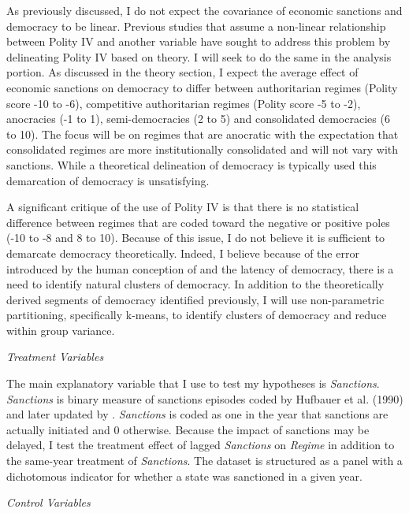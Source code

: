 \documentclass[a4paper]{article}\usepackage[]{graphicx}\usepackage[]{color}
\begin{document}
\par
As previously discussed, I do not expect the covariance of economic sanctions and democracy to be linear. Previous studies that assume a non-linear relationship between Polity IV and another variable have sought to address this problem by delineating Polity IV based on theory. I will seek to do the same in the analysis portion. As discussed in the theory section, I expect the average effect of economic sanctions on democracy to differ between authoritarian regimes (Polity score -10 to -6), competitive authoritarian regimes (Polity score -5 to -2), anocracies (-1 to 1), semi-democracies (2 to 5) and consolidated democracies (6 to 10). The focus will be on regimes that are anocratic \citep{vreeland2008effect, hegre2001toward, fearon2003ethnicity} with the expectation that consolidated regimes are more institutionally consolidated and will not vary with sanctions. While a theoretical delineation of democracy is typically used this demarcation of democracy is unsatisfying.  
\par
A significant critique of the use of Polity IV is that there is no statistical difference between regimes that are coded toward the negative or positive poles (-10 to -8 and 8 to 10)\citep{treier2008democracy}. Because of this issue, I do not believe it is sufficient to demarcate democracy theoretically.  Indeed, I believe because of the error introduced by the human conception of and the latency of democracy, there is a need to identify natural clusters of democracy. In addition to the theoretically derived segments of democracy identified previously, I will use non-parametric partitioning, specifically k-means, to identify clusters of democracy and reduce within group variance. 
\par
\centerline{\textit{Treatment Variables}}
\par
The main explanatory variable that I use to test my hypotheses is \textit{Sanctions}. \textit{Sanctions} is binary measure of sanctions episodes coded by Hufbauer et al. (1990) and later updated by \citet{marinov2005economic}. \textit{Sanctions} is coded as one in the year that sanctions are actually initiated and 0 otherwise. Because the impact of sanctions may be delayed, I test the treatment effect of lagged \textit{Sanctions} on \textit{Regime} in addition to the same-year treatment of \textit{Sanctions}. The dataset is structured as a panel with a dichotomous indicator for whether a state was sanctioned in a given year. 
\\
\centerline{\textit{Control Variables}}
\end{document}
